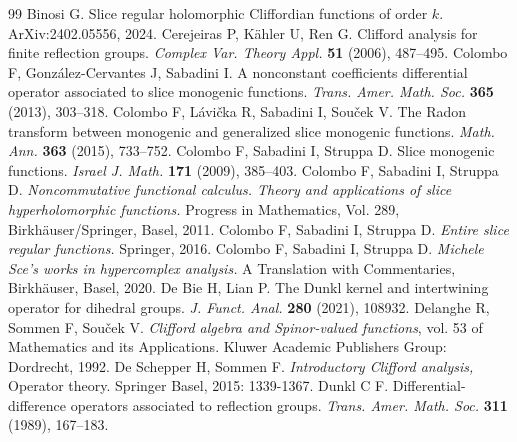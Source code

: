 \documentclass{amsart}
\theoremstyle{definition}
\theoremstyle{remark}
\numberwithin{equation}{section}
\begin{document}


\begin{thebibliography}{99}
Binosi G. Slice regular holomorphic Cliffordian functions of order $ k$.  ArXiv:2402.05556, 2024.
 Cerejeiras P, K\"ahler U, Ren G. Clifford analysis for finite reflection groups. {\em Complex Var. Theory Appl.} {\bf 51} (2006), 487--495.
 Colombo F, Gonz\'alez-Cervantes J, Sabadini I. A nonconstant coefficients differential operator associated to slice monogenic functions. {\em Trans. Amer. Math. Soc.} {\bf 365} (2013),  303--318.
 Colombo F, L\'avi\v{c}ka R, Sabadini I, Sou\v{c}ek V. The Radon transform between
monogenic and generalized slice monogenic functions. {\em Math. Ann.} {\bf 363} (2015), 733--752.
 Colombo F, Sabadini I,  Struppa D. Slice monogenic functions. {\em Israel J. Math.} {\bf 171}
(2009), 385--403.
  Colombo F, Sabadini I, Struppa D. {\em Noncommutative functional calculus.
Theory and applications of slice hyperholomorphic functions.} Progress in Mathematics, Vol. 289, Birkh\"auser/Springer, Basel, 2011.
 Colombo F, Sabadini I, Struppa D. {\em Entire slice regular functions.} Springer, 2016.
 Colombo F, Sabadini I, Struppa D. {\em Michele Sce’s works in hypercomplex analysis.} A Translation with Commentaries, Birkh\"auser, Basel, 2020.
 De Bie H, Lian P. The Dunkl kernel and intertwining operator for dihedral groups. {\em J. Funct. Anal.} {\bf 280} (2021),  108932.
 Delanghe R, Sommen F, Sou\v{c}ek V. {\em Clifford algebra and Spinor-valued functions}, vol. 53 of Mathematics and its Applications. Kluwer Academic Publishers Group: Dordrecht, 1992.
 De Schepper H, Sommen F. {\em Introductory Clifford analysis,} Operator theory. Springer Basel, 2015: 1339-1367.
 Dunkl C F. Differential-difference operators associated to reflection groups. {\em Trans. Amer. Math. Soc.} {\bf 311} (1989), 167--183.

\end{thebibliography}
\end{document}
